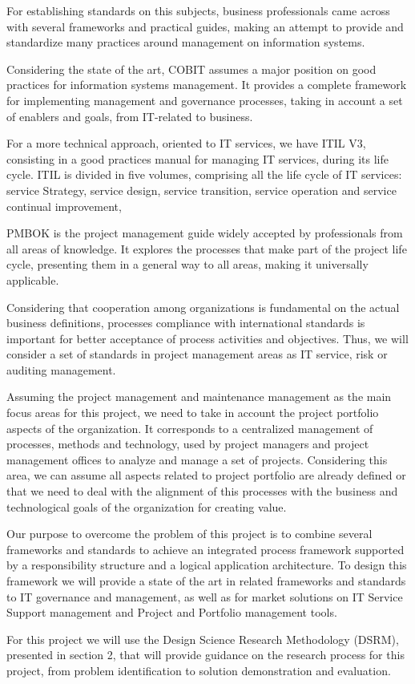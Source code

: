 For establishing standards on this subjects, business professionals came across with several frameworks and practical guides, making an attempt to provide and standardize many practices around management on information systems.\par
Considering the state of the art, COBIT assumes a major position on good practices for information systems management. It provides a complete framework for implementing management and governance processes, taking in account a set of enablers and goals, from IT-related to business.\par
For a more technical approach, oriented to IT services, we have ITIL V3, consisting in a good practices manual for managing IT services, during its life cycle. ITIL is divided in five volumes, comprising all the life cycle of IT services: service Strategy, service design, service transition, service operation and service continual improvement,\par
PMBOK is the project management guide widely accepted by professionals from all areas of knowledge. It explores the processes that make part of the project life cycle, presenting them in a general way to all areas, making it universally applicable.\par
Considering that cooperation among organizations is fundamental on the actual business definitions, processes compliance with international standards is important for better acceptance of process activities and objectives. Thus, we will consider a set of standards in project management areas as IT service, risk or auditing management.\par   
Assuming the project management and maintenance management as the main focus areas for this project, we need to take in account the project portfolio aspects of the organization. It corresponds to a centralized management of processes, methods and technology, used by project managers and project management offices to analyze and manage a set of projects. Considering this area, we can assume all aspects related to project portfolio are already defined or that we need to deal with the alignment of this processes with the business and technological goals of the organization for creating value.\par
Our purpose to overcome the problem of this project is to combine several frameworks and standards to achieve an integrated process framework supported by a responsibility structure and a logical application architecture. To design this framework we will provide a state of the art in related frameworks and standards to IT governance and management, as well as for market solutions on IT Service Support management and Project and Portfolio management tools.\par
For this project we will use the Design Science Research Methodology (DSRM)\cite{DSRM}, presented in section 2, that will provide guidance on the research process for this project, from problem identification to solution demonstration and evaluation.\par